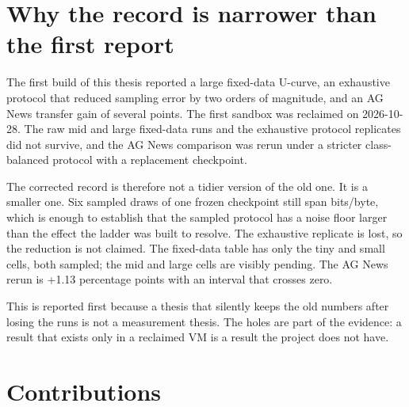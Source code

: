 \section{Why the record is narrower than the first report}

The first build of this thesis reported a large fixed-data U-curve, an exhaustive
protocol that reduced sampling error by two orders of magnitude, and an AG News
transfer gain of several points. The first sandbox was reclaimed on 2026-10-28.
The raw mid and large fixed-data runs and the exhaustive protocol replicates did
not survive, and the AG News comparison was rerun under a stricter class-balanced
protocol with a replacement checkpoint.

The corrected record is therefore not a tidier version of the old one. It is a
smaller one. Six sampled draws of one frozen checkpoint still span
\ProtoOldSpread{} bits/byte, which is enough to establish that the sampled protocol
has a noise floor larger than the effect the ladder was built to resolve. The
exhaustive replicate is lost, so the reduction is not claimed. The fixed-data
table has only the tiny and small cells, both sampled; the mid and large cells are
visibly pending. The AG News rerun is +1.13 percentage points with an interval
that crosses zero.

This is reported first because a thesis that silently keeps the old numbers after
losing the runs is not a measurement thesis. The holes are part of the evidence:
a result that exists only in a reclaimed VM is a result the project does not have.

\section{Contributions}

